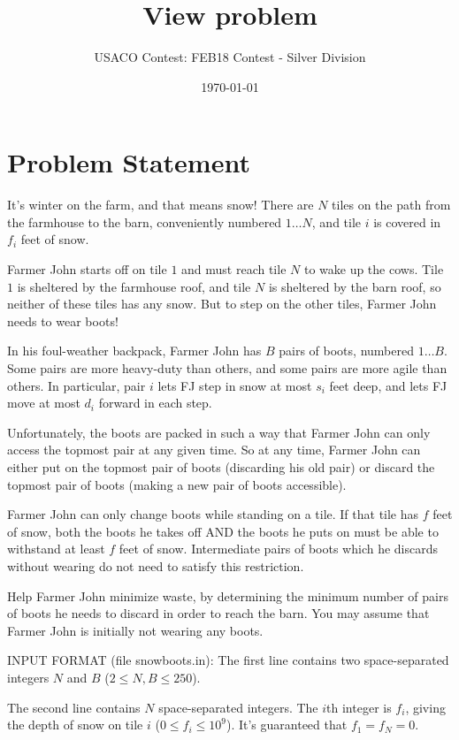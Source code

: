 \documentclass[12pt]{article}
\title{View problem}
\author{USACO Contest: FEB18 Contest - Silver Division}
\date{\today}
\begin{document}
\maketitle

\section*{Problem Statement}

It's winter on the farm, and that means snow! There are $N$ tiles on the path
from the farmhouse to the barn, conveniently numbered $1 \dots N$, and tile $i$
is covered in $f_i$ feet of snow. 

Farmer John starts off on tile $1$ and must reach tile $N$ to wake up the cows.
Tile $1$ is sheltered by the farmhouse roof, and tile $N$ is sheltered by the
barn roof, so neither of these tiles has any snow. But to step on the other
tiles, Farmer John needs to wear boots!

In his foul-weather backpack, Farmer John has $B$ pairs of boots, numbered
$1 \dots B$. Some pairs are more heavy-duty than others, and some pairs are more
agile than others. In particular, pair $i$ lets FJ step in snow at most $s_i$
feet deep, and lets FJ move at most $d_i$ forward in each step.

Unfortunately, the boots are packed in such a way that Farmer John can only
access the topmost pair at any given time. So at any time, Farmer John can
either put on the topmost pair of boots (discarding his old pair) or discard the
topmost pair of boots (making a new pair of boots accessible).

Farmer John can only change boots while standing on a tile. If that tile has $f$
feet of snow, both the boots he takes off AND the boots he puts on must be able
to withstand at least $f$ feet of snow. Intermediate pairs of boots which he
discards without wearing do not need to satisfy this restriction.

Help Farmer John minimize waste, by determining the minimum number of pairs of
boots he needs to discard in order to reach the barn.  You may assume that
Farmer John is initially not wearing any boots.

INPUT FORMAT (file snowboots.in):
The first line contains two space-separated integers $N$ and $B$
($2 \leq N,B \leq 250$).

The second line contains $N$ space-separated integers.  The $i$th integer is
$f_i$, giving the depth of snow on tile $i$ ($0 \leq f_i \leq 10^9$). It's
guaranteed that $f_1 = f_N = 0$.
\end{document}
